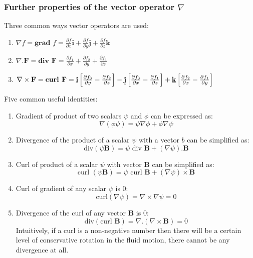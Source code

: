 \documentclass[10pt,a4paper]{article}
\begin{document}
\subsubsection{Further properties of the vector operator $\nabla$}

Three common ways vector operators are used:
\begin{enumerate}
    \item $\nabla f = \textbf{grad }f = \frac{\partial f}{\partial x} \textbf{i} + \frac{\partial
    f}{\partial y} \textbf{j} + \frac{\partial f}{\partial z} \textbf{k}$

    \item $\nabla.\textbf{F}=\textbf{div }\textbf{F} = \frac{\partial f_1}{\partial
    x}+\frac{\partial f_2}{\partial y}+\frac{\partial f_3}{\partial z}$

    \item $\nabla \times \textbf{F} = \textbf{curl }\textbf{F} = \textbf{\underline{i}}\left[\frac{\partial f_3}{\partial y}-\frac{\partial f_2}{\partial z}\right] - \textbf{\underline{j}}\left[\frac{\partial f_3}{\partial x}-\frac{\partial f_1}{\partial z}\right] + \textbf{\underline{k}}\left[\frac{\partial f_2}{\partial x}-\frac{\partial f_1}{\partial y}\right]$
\end{enumerate}

Five common useful identities:
\begin{enumerate}
    \item Gradient of product of two scalars $\psi$ and $\phi$ can be expressed as:
    $$
        \nabla(\phi \psi) = \psi\nabla\phi + \phi\nabla\psi
    $$
    \item Divergence of the product of a scalar $\psi$ with a vector $b$ can be simplified as:
    $$
        \text{div}(\psi \textbf{B}) = \psi\text{ div }\textbf{B} + (\nabla\psi).\textbf{B}
    $$
    \item Curl of product of a scalar $\psi$ with vector $\textbf{B}$ can be simplified as:
    $$
        \text{curl }(\psi \textbf{B}) = \psi\text{ curl }\textbf{B} + (\nabla \psi) \times \textbf{B}
    $$
    \item Curl of gradient of any scalar $\psi$ is 0:
    $$
        \text{curl}(\nabla \psi) = \nabla \times \nabla\psi = 0
    $$
    \item Divergence of the curl of any vector $\textbf{B}$ is 0:
    $$
        \text{div}(\text{curl }\textbf{B})=\nabla.(\nabla\times \textbf{B}) = 0
    $$
    Intuitively, if a curl is a non-negative number then there will be a certain level of
    conservative rotation in the fluid motion, there cannot be any divergence at all.
\end{enumerate}
\end{document}
